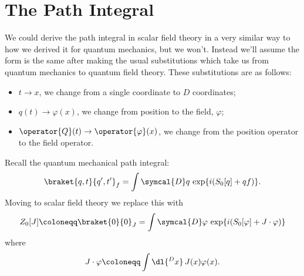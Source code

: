 \documentclass[fleqn]{NotesClass}
\newcommand{\DL}[1]{\symcal{D}#1}
\begin{document}
    \section{The Path Integral}
    We could derive the path integral in scalar field theory in a very similar way to how we derived it for quantum mechanics, but we won't.
    Instead we'll assume the form is the same after making the usual substitutions which take us from quantum mechanics to quantum field theory.
    These substitutions are as follows:
    \begin{itemize}
        \item \(t \to x\), we change from a single coordinate to \(D\) coordinates;
        \item \(q(t) \to \varphi(x)\), we change from position to the field, \(\varphi\);
        \item \(\operator{Q}(t) \to \operator{\varphi}(x)\), we change from the position operator to the field operator.
    \end{itemize}
    
    Recall the quantum mechanical path integral:
    \begin{equation}
        \braket{q, t}{q', t'}_{f} = \int \DL{q} \, \exp\{i(S_0[q] + qf)\}.
    \end{equation}
    Moving to scalar field theory we replace this with
    \begin{align}
        Z_0[J] \coloneqq \braket{0}{0}_J = \int \DL{\varphi} \, \exp\{i(S_0[\varphi] + J \cdot \varphi)\}
    \end{align}
    where
    \begin{equation}
        J \cdot \varphi \coloneqq \int \dl{^Dx} \, J(x)\varphi(x).
    \end{equation}
    
\end{document}
